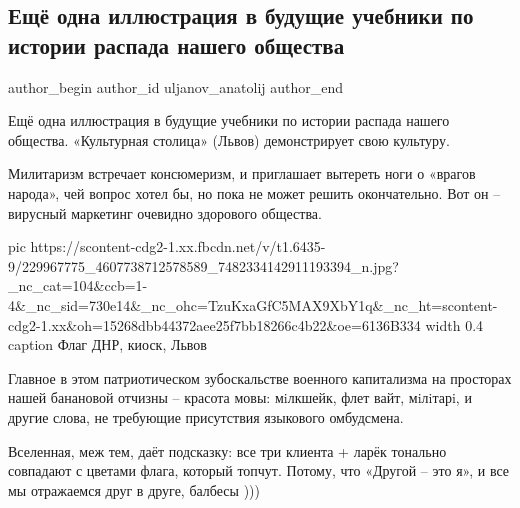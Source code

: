  
 
 
 
 
 
\subsection{Ещё одна иллюстрация в будущие учебники по истории распада нашего общества}
\label{sec:09_08_2021.fb.uljanov_anatolij.1.dnr_flag_lvov}
 
\ifcmt
 author_begin
   author_id uljanov_anatolij
 author_end
\fi

Ещё одна иллюстрация в будущие учебники по истории распада нашего общества.
«Культурная столица» (Львов) демонстрирует свою культуру. 

Милитаризм встречает консюмеризм, и приглашает вытереть ноги о «врагов народа»,
чей вопрос хотел бы, но пока не может решить окончательно. Вот он – вирусный
маркетинг очевидно здорового общества. 

\ifcmt
  pic https://scontent-cdg2-1.xx.fbcdn.net/v/t1.6435-9/229967775_4607738712578589_7482334142911193394_n.jpg?_nc_cat=104&ccb=1-4&_nc_sid=730e14&_nc_ohc=TzuKxaGfC5MAX9XbY1q&_nc_ht=scontent-cdg2-1.xx&oh=15268dbb44372aee25f7bb18266c4b22&oe=6136B334
  width 0.4
	caption Флаг ДНР, киоск, Львов
\fi

Главное в этом патриотическом зубоскальстве военного капитализма на просторах
нашей банановой отчизны – красота мовы: мiлкшейк, флет вайт, мiлiтарi, и другие
слова, не требующие присутствия языкового омбудсмена. 

Вселенная, меж тем, даёт подсказку: все три клиента + ларёк тонально совпадают
с цветами флага, который топчут. Потому, что «Другой – это я», и все мы
отражаемся друг в друге, балбесы )))

